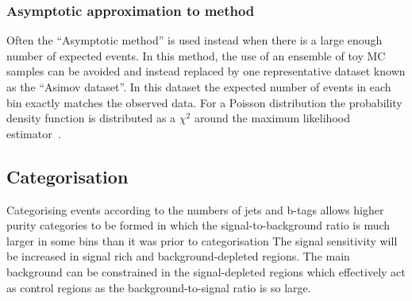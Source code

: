 \subsubsection{Asymptotic approximation to \CLS method}
Often the ``Asymptotic \CLS method'' is used instead when there is a large enough number of expected events. In this method, the use of an ensemble of toy MC samples can be avoided and instead replaced by one representative dataset known as the ``Asimov dataset''. In this dataset the expected number of events in each bin exactly matches the observed data. For a Poisson distribution the probability density function is distributed as a $\chi^2$ around the maximum likelihood estimator~\cite{Cowan:2011js}. 





\subsection{Categorisation}
\label{sec:Cats}

Categorising events according to the numbers of jets and b-tags allows higher purity categories to be formed in which the signal-to-background ratio is much larger in some bins than it was prior to categorisation The signal sensitivity will be increased in signal rich and background-depleted regions. The main \ttbar background can be constrained in the signal-depleted regions which effectively act as control regions as the background-to-signal ratio is so large. 




